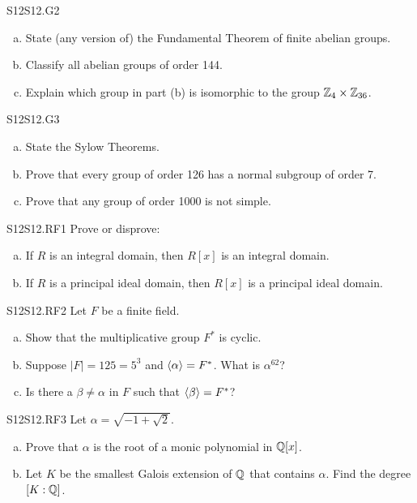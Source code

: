 \documentclass[../AlgebraQualSolutions.tex]{subfiles}
\begin{document}
\begin{prob}{S12}{S12.G2}
	\begin{enumerate}[(a)]
		\item State (any version of) the Fundamental Theorem of finite abelian groups.
		\item Classify all abelian groups of order 144.
		\item Explain which group in part (b) is isomorphic to the group $\mathbb{Z}_4 \times \mathbb{Z}_{36}$.
	\end{enumerate}
\end{prob}

\begin{prob}{S12}{S12.G3}
	\begin{enumerate}[(a)]
		\item State the Sylow Theorems.
		\item Prove that every group of order 126 has a normal subgroup of order 7.
		\item Prove that any group of order 1000 is not simple.
	\end{enumerate}
\end{prob}

\begin{prob}{S12}{S12.RF1}
	Prove or disprove:

	\begin{enumerate}[(a)]
		\item If $R$ is an integral domain, then $R[x]$ is an integral domain.
		\item If $R$ is a principal ideal domain, then $R[x]$ is a principal ideal domain.
	\end{enumerate}
\end{prob}

\begin{prob}{S12}{S12.RF2}
	Let $F$ be a finite field.

	\begin{enumerate}[(a)]
		\item Show that the multiplicative group $F^*$ is cyclic.
		\item Suppose $|F| = 125 = 5^3$ and $\left\langle \alpha \right\rangle = F^*$. What is $\alpha^{62}$?
		\item Is there a $\beta \neq \alpha$ in $F$ such that $\left\langle \beta \right\rangle = F^*$?
	\end{enumerate}
\end{prob}

\begin{prob}{S12}{S12.RF3}
	Let $\alpha = \sqrt{-1+\sqrt{2}}$.
	\begin{enumerate}[(a)]
		\item Prove that $\alpha$ is the root of a monic polynomial in $\mathbb{Q}[x]$.
		\item Let $K$ be the smallest Galois extension of $\mathbb{Q}$ that contains $\alpha$. Find the degree $[K: \mathbb{Q}]$.
	\end{enumerate}
\end{prob}
\end{document}
